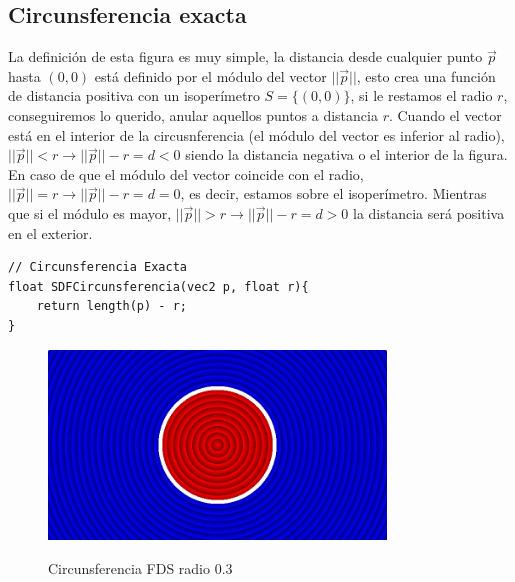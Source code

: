 \subsection{Circunsferencia exacta}
La definición de esta figura es muy simple, la distancia desde cualquier punto \(\Vec{p}\) hasta \((0,0)\) está definido por el módulo del vector \(\vert\vert\Vec{p}\vert\vert\), esto crea una función de distancia positiva con un isoperímetro \(S=\{(0,0)\}\), si le restamos el radio \(r\), conseguiremos lo querido, anular aquellos puntos a distancia \(r\). Cuando el vector está en el interior de la circusnferencia (el módulo del vector es inferior al radio), \(\vert\vert\Vec{p}\vert\vert < r \longrightarrow \vert\vert\Vec{p}\vert\vert - r=d < 0\) siendo la distancia negativa o el interior de la figura. En caso de que el módulo del vector coincide con el radio, \(\vert\vert\Vec{p}\vert\vert = r \longrightarrow \vert\vert\Vec{p}\vert\vert - r=d = 0\), es decir, estamos sobre el isoperímetro. Mientras que si el módulo es mayor, \(\vert\vert\Vec{p}\vert\vert > r \longrightarrow \vert\vert\Vec{p}\vert\vert - r=d > 0\) la distancia será positiva en el exterior.
\begin{lstlisting}
// Circunsferencia Exacta
float SDFCircunsferencia(vec2 p, float r){
    return length(p) - r;
}
\end{lstlisting}
\begin{figure}[H]
  \centering
  \captionsetup{justification=centering}%
  \includegraphics[width=0.8\textwidth]{secciones/imagenes/sdf/2d/sdf_circunsferencia.png}\label{fig:circ}
  \caption{Circunsferencia FDS radio \(0.3\)}
\end{figure}

